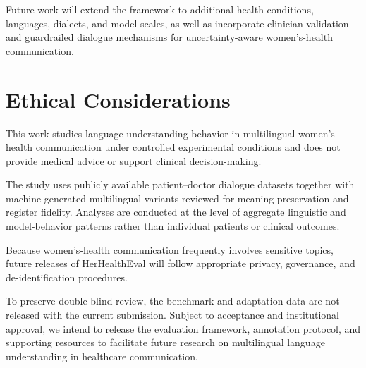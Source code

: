 Future work will extend the framework to additional health conditions, languages, dialects, and model scales, as well as incorporate clinician validation and guardrailed dialogue mechanisms for uncertainty-aware women's-health communication.


\section*{Ethical Considerations}
\label{sec:ethics}

This work studies language-understanding behavior in multilingual women's-health communication under controlled experimental conditions and does not provide medical advice or support clinical decision-making.

The study uses publicly available patient--doctor dialogue datasets together with machine-generated multilingual variants reviewed for meaning preservation and register fidelity. Analyses are conducted at the level of aggregate linguistic and model-behavior patterns rather than individual patients or clinical outcomes.

Because women's-health communication frequently involves sensitive topics, future releases of HerHealthEval will follow appropriate privacy, governance, and de-identification procedures.

To preserve double-blind review, the benchmark and adaptation data are not released with the current submission. Subject to acceptance and institutional approval, we intend to release the evaluation framework, annotation protocol, and supporting resources to facilitate future research on multilingual language understanding in healthcare communication.
